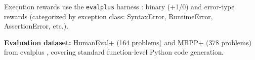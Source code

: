 Execution rewards use the \texttt{evalplus} harness \cite{Liu2023EvalPlus}:
binary (+1/0) and error-type rewards (categorized by exception class:
SyntaxError, RuntimeError, AssertionError, etc.).

\textbf{Evaluation dataset:} HumanEval+ (164 problems) and MBPP+ (378 problems)
from evalplus \cite{Liu2023EvalPlus}, covering standard function-level Python
code generation.
